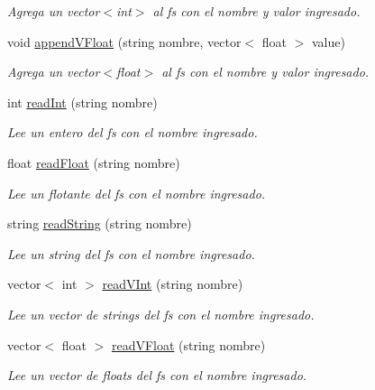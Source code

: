 \begin{DoxyCompactItemize}
\begin{DoxyCompactList}\small\item\em Agrega un vector$<$int$>$ al fs con el nombre y valor ingresado. \end{DoxyCompactList}\item 
void \mbox{\hyperlink{classFSManager_ad6419bbb1dbc6c1059642416045dbd99}{append\+V\+Float}} (string nombre, vector$<$ float $>$ value)
\begin{DoxyCompactList}\small\item\em Agrega un vector$<$float$>$ al fs con el nombre y valor ingresado. \end{DoxyCompactList}\item 
int \mbox{\hyperlink{classFSManager_a819ea57611717a89633a5b02cb4d0f10}{read\+Int}} (string nombre)
\begin{DoxyCompactList}\small\item\em Lee un entero del fs con el nombre ingresado. \end{DoxyCompactList}\item 
float \mbox{\hyperlink{classFSManager_a5362f82406fa9501f3c5126987565dc1}{read\+Float}} (string nombre)
\begin{DoxyCompactList}\small\item\em Lee un flotante del fs con el nombre ingresado. \end{DoxyCompactList}\item 
string \mbox{\hyperlink{classFSManager_ac8de8da2e2ebf395340b46b353cec02e}{read\+String}} (string nombre)
\begin{DoxyCompactList}\small\item\em Lee un string del fs con el nombre ingresado. \end{DoxyCompactList}\item 
vector$<$ int $>$ \mbox{\hyperlink{classFSManager_a517c15d5e51eb4f07e6ada3aa38e1d0b}{read\+V\+Int}} (string nombre)
\begin{DoxyCompactList}\small\item\em Lee un vector de strings del fs con el nombre ingresado. \end{DoxyCompactList}\item 
vector$<$ float $>$ \mbox{\hyperlink{classFSManager_a1b052468230cc452488cadadc7a940d5}{read\+V\+Float}} (string nombre)
\begin{DoxyCompactList}\small\item\em Lee un vector de floats del fs con el nombre ingresado. \end{DoxyCompactList}\item 

\end{DoxyCompactItemize}

